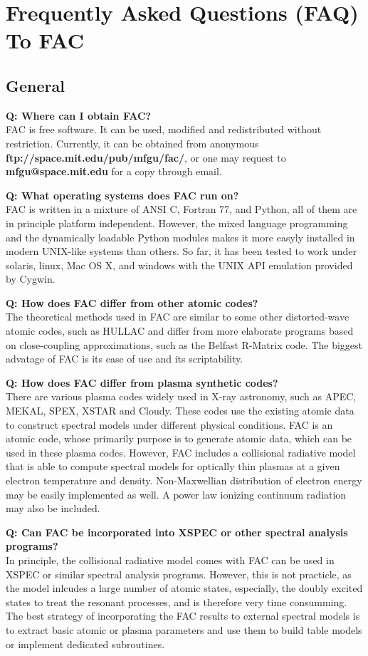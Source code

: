\documentclass[twoside,letterpaper]{refrep}
\newcounter{faq}[section]
\newcommand{\faq}[2]{\stepcounter{faq}
	\begin{minipage}{\textwidth}
	\textbf{Q\arabic{faq}: #1?}\\#2
	\end{minipage}}
\begin{document}
\chapter{Frequently Asked Questions (FAQ) To FAC}
\section{General}
\faq{Where can I obtain FAC}{
FAC is free software. It can be used, modified and redistributed
without restriction. Currently, it can be obtained from anonymous
\textbf{ftp://space.mit.edu/pub/mfgu/fac/}, or one may request to
\textbf{mfgu@space.mit.edu} for a copy through email.}

\faq{What operating systems does FAC run on}{
FAC is written in a mixture of ANSI C, Fortran 77, and Python, all of them are
in principle platform independent. However, the mixed language programming and
the dynamically loadable Python modules makes it more easyly installed in
modern UNIX-like systems than others. So far, it has been tested to work under
solaris, linux, Mac OS X, and windows with the UNIX API emulation provided by
Cygwin.}
  
\faq{How does FAC differ from other atomic codes}{
The theoretical methods used in FAC are similar to some other distorted-wave
atomic codes, such as HULLAC and differ from more elaborate programs based on
close-coupling approximations, such as the Belfast R-Matrix code. The biggest
advatage of FAC is its ease of use and its scriptability.}

\faq{How does FAC differ from plasma synthetic codes}{
There are various plasma codes widely used in X-ray astronomy, such as APEC,
MEKAL, SPEX, XSTAR and Cloudy. These codes use the existing atomic data to
construct spectral models under different physical conditions. FAC is an
atomic code, whose primarily purpose is to generate atomic data, which can be
used in these plasma codes. However, FAC includes a collisional radiative
model that is able to compute spectral models for optically thin plasmas at a
given electron temperature and density. Non-Maxwellian distribution of electron
energy may be easily implemented as well. A power law ionizing continuum
radiation may also be included.}

\faq{Can FAC be incorporated into XSPEC or other spectral analysis programs}{
In principle, the collisional radiative model comes with FAC can be used in
XSPEC or similar spectral analysis programs. However, this is not practicle,
as the model inlcudes a large number of atomic states, especially, the doubly
excited states to treat the resonant processes, and is therefore very time
consumming. The best strategy of incorporating the FAC results to external
spectral models is to extract basic atomic or plasma parameters and use them
to build table models or implement dedicated subroutines.}
\end{document}
